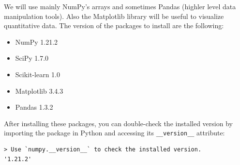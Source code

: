 \documentclass[12pt]{report}
\theoremstyle{largebreak}
\begin{document}
    We will use mainly NumPy's arrays and sometimes Pandas (highler level data manipulation tools). Also the Matplotlib library will be useful to visualize quantitative data. The version of the packages to install are the following:
    \begin{itemize}
        \item NumPy 1.21.2
        \item SciPy 1.7.0
        \item Scikit-learn 1.0
        \item Matplotlib 3.4.3
        \item Pandas 1.3.2
    \end{itemize}
    After installing these packages, you can double-check the installed version by importing the package in Python and accessing its \lstinline|__version__| attribute:
    \begin{lstlisting}[caption={Check Version of Packages},label=code:version_package_verification]
> Use `numpy.__version__` to check the installed version.
'1.21.2'
    \end{lstlisting}

    
\end{document}
